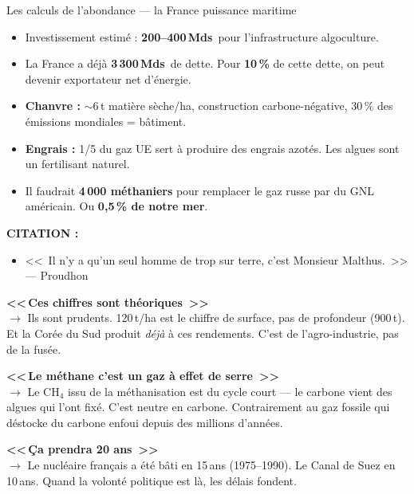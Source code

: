 \documentclass[a4paper,11pt]{article}
\newcommand{\stat}[1]{\textbf{\textcolor{ChapColor}{#1}}}
\begin{document}
\begin{fichejaune}{Les calculs de l'abondance --- la France puissance maritime}
\begin{itemize}[nosep, label=\color{ModeJaune}$\blacktriangleright$]
  \item Investissement estim\'{e} : \stat{200--400\,Mds\,\texteuro} pour l'infrastructure algoculture.
  \item La France a d\'{e}j\`{a} \stat{3\,300\,Mds\,\texteuro} de dette. Pour \textbf{10\,\%} de cette dette, on peut devenir exportateur net d'\'{e}nergie.
  \item \textbf{Chanvre :} $\sim$6\,t mati\`{e}re s\`{e}che/ha, construction carbone-n\'{e}gative, 30\,\% des \'{e}missions mondiales = b\^{a}timent.
  \item \textbf{Engrais :} 1/5 du gaz UE sert \`{a} produire des engrais azot\'{e}s. Les algues sont un fertilisant naturel.
  \item Il faudrait \stat{4\,000 m\'{e}thaniers} pour remplacer le gaz russe par du GNL am\'{e}ricain. Ou \textbf{0{,}5\,\% de notre mer}.
\end{itemize}

\vspace{0.3cm}
\textbf{CITATION :}
\begin{itemize}[nosep, font=\itshape]
  \item <<~Il n'y a qu'un seul homme de trop sur terre, c'est Monsieur Malthus.~>> --- Proudhon
\end{itemize}

\begin{contrearg}
\textbf{<<\,Ces chiffres sont th\'{e}oriques~>>}\\
$\rightarrow$ Ils sont prudents. 120\,t/ha est le chiffre de surface, pas de profondeur (900\,t). Et la Cor\'{e}e du Sud produit \emph{d\'{e}j\`{a}} \`{a} ces rendements. C'est de l'agro-industrie, pas de la fus\'{e}e.

\textbf{<<\,Le m\'{e}thane c'est un gaz \`{a} effet de serre~>>}\\
$\rightarrow$ Le CH$_4$ issu de la m\'{e}thanisation est du cycle court --- le carbone vient des algues qui l'ont fix\'{e}. C'est neutre en carbone. Contrairement au gaz fossile qui d\'{e}stocke du carbone enfoui depuis des millions d'ann\'{e}es.

\textbf{<<\,\c{C}a prendra 20 ans~>>}\\
$\rightarrow$ Le nucl\'{e}aire fran\c{c}ais a \'{e}t\'{e} b\^{a}ti en 15\,ans (1975--1990). Le Canal de Suez en 10\,ans. Quand la volont\'{e} politique est l\`{a}, les d\'{e}lais fondent.
\end{contrearg}


\end{fichejaune}
\end{document}
